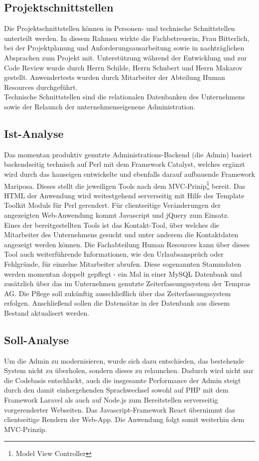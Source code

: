 \subsection{Projektschnittstellen}
    Die Projektschnittstellen können in Personen- und technische Schnittstellen unterteilt werden. In diesem Rahmen wirkte die Fachbetreuerin, Frau Bitterlich, bei der Projektplanung und Anforderungsausarbeitung sowie in nachträglichen Absprachen zum Projekt mit. Unterstützung während der Entwicklung und zur Code Review wurde durch Herrn Schilde, Herrn Schubert und Herrn Makarov gestellt. Anwendertests wurden durch Mitarbeiter der Abteilung Human Resources durchgeführt.\\
    Technische Schnittstellen sind die relationalen Datenbanken des Unternehmens sowie der Relaunch der unternehmenseigenene Administration.

\subsection{Ist-Analyse}
    Das momentan produktiv genutzte Administrations-Backend (\glqq die Admin\grqq{}) basiert backendseitig technisch auf Perl mit dem Framework \glqq Catalyst\grqq{}, welches ergänzt wird durch das hauseigen entwickelte und ebenfalls darauf aufbauende Framework \glqq Mariposa\grqq{}. Dieses stellt die jeweiligen Tools nach dem MVC-Prinip\footnote{Model View Controller} bereit. Das HTML der Anwendung wird weitestgehend serverseitig mit Hilfe des \glqq Template Toolkit\grqq{} Moduls für Perl gerendert. Für clientseitige Veränderungen der angezeigten Web-Anwendung kommt Javascript und jQuery zum Einsatz.\\
    Eines der bereitgestellten Tools ist das Kontakt-Tool, über welches die Mitarbeiter des Unternehmens gesucht und unter anderem die Kontaktdaten angezeigt werden können. Die Fachabteilung Human Resources kann über dieses Tool auch weiterführende Informationen, wie den Urlaubsansprüch oder Fehlgründe, für einzelne Mitarbeiter abrufen. Diese sogenannten Stammdaten werden momentan doppelt gepflegt - ein Mal in einer MySQL Datenbank und zusätzlich über das im Unternehmen genutzte Zeiterfassungssystem der Tempras AG. Die Pflege soll zukünftig ausschließlich über das Zeiterfassungssystem erfolgen. Anschließend sollen die Datensätze in der Datenbank aus diesem Bestand aktualisert werden.

\subsection{Soll-Analyse}
    Um die Admin zu modernisieren, wurde sich dazu entschieden, das bestehende System nicht zu überholen, sondern dieses zu relaunchen. Dadurch wird nicht nur die Codebasis entschlackt, auch die insgesamte Performance der Admin steigt durch den damit einhergehenden Sprachwechsel sowohl auf PHP mit dem Framework \glqq Laravel\grqq{} als auch auf Node.js zum Bereitstellen serverseitig vorgerenderter Webseiten. Das Javascript-Framework \glqq React\grqq{} übernimmt das clientseitige Rendern der Web-App. Die Anwendung folgt somit weiterhin dem MVC-Prinzip.

